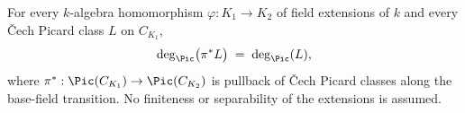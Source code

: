 \begin{theorem}
  \label{thm:classDeg_cechPicMap_baseFieldTransition}
  \leanok
  For every \(k\)-algebra homomorphism \(\varphi : K_1 \to K_2\) of field extensions of
  \(k\) and every \v Cech Picard class \(L\) on \(C_{K_1}\),
  \[
    \deg_{\Pic}\bigl(\pi^{*}L\bigr) \;=\; \deg_{\Pic}(L),
  \]
  where \(\pi^{*} : \Pic(C_{K_1}) \to \Pic(C_{K_2})\) is pullback of \v Cech Picard
  classes along the base-field transition. No finiteness or separability of the
  extensions is assumed.
\end{theorem}
